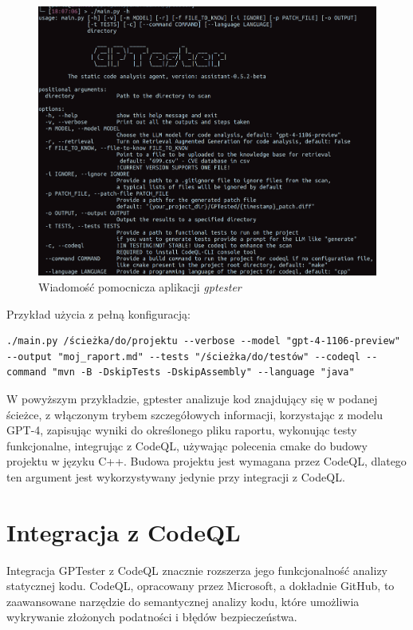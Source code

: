 \begin{figure}[H]
    \centering
    \includegraphics[width=\linewidth]{img/gptester-help.png}
    \caption{Wiadomość pomocnicza aplikacji \textit{gptester}}
    \label{fig:gptester-help}
\end{figure}

Przykład użycia z pełną konfiguracją:

\begin{listing}
    \begin{verbatim}
./main.py /ścieżka/do/projektu --verbose --model "gpt-4-1106-preview" --output "moj_raport.md" --tests "/ścieżka/do/testów" --codeql --command "mvn -B -DskipTests -DskipAssembly" --language "java"
\end{verbatim}
\end{listing}

W powyższym przykładzie, gptester analizuje kod znajdujący się w podanej ścieżce, z włączonym trybem szczegółowych informacji, korzystając z modelu GPT-4, zapisując wyniki do określonego pliku raportu, wykonując testy funkcjonalne, integrując z CodeQL, używając polecenia cmake do budowy projektu w języku C++. Budowa projektu jest wymagana przez CodeQL, dlatego ten argument jest wykorzystywany jedynie przy integracji z CodeQL.

\section{Integracja z CodeQL}

Integracja GPTester z CodeQL znacznie rozszerza jego funkcjonalność analizy statycznej kodu. CodeQL, opracowany przez Microsoft, a dokładnie GitHub, to zaawansowane narzędzie do semantycznej analizy kodu, które umożliwia wykrywanie złożonych podatności i błędów bezpieczeństwa.

